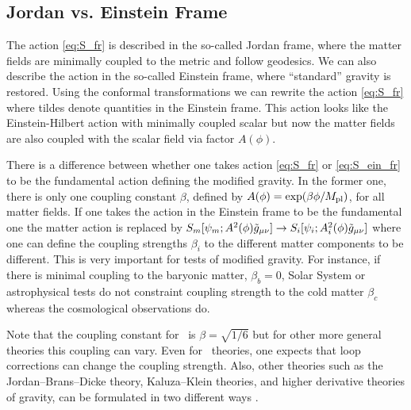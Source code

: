 \subsection{Jordan vs. Einstein Frame}
The action \eqref{eq:S_fr} is described in the so-called Jordan frame, where the matter fields are minimally coupled to the metric and follow geodesics. We can also describe the action in the so-called Einstein frame, where ``standard'' gravity is restored. Using the conformal transformations
we can rewrite the action \eqref{eq:S_fr}
where tildes denote quantities in the Einstein frame. This action looks like the Einstein-Hilbert action with minimally coupled scalar but now the matter fields are also coupled with the scalar field via factor $A(\phi)$. %

There is a difference between whether one takes action \eqref{eq:S_fr} or \eqref{eq:S_ein_fr} to be the fundamental action defining the modified gravity. In the former one, there is only one coupling constant $\beta$, defined by $A(\phi)=\exp(\beta\phi/M_{\text{\scriptsize pl}})$, for all matter fields. If one takes the action in the Einstein frame to be the fundamental one the matter action is replaced by $S_m[\psi_m;A^2(\phi)\tilde{g}_{\mu\nu}]\rightarrow S_i[\psi_i;A_i^2(\phi)\tilde{g}_{\mu\nu}]$ where one can define the coupling strengths $\beta_i$ to the different matter components to be different. This is very important for tests of modified gravity. For instance, if there is minimal coupling to the baryonic matter, $\beta_b=0$, Solar System or astrophysical tests do not constraint coupling strength to the cold matter $\beta_c$ whereas the cosmological observations do.

Note that the coupling constant for \fR\ is $\beta=\sqrt{1/6}$ but for other more general theories this coupling can vary. Even for \fR\ theories, one expects that loop corrections can change the coupling strength. Also, other theories such as the Jordan--Brans--Dicke theory, Kaluza--Klein theories, and higher derivative theories of gravity, can be formulated in two different ways \parencite{Faraoni:1998qx}.


